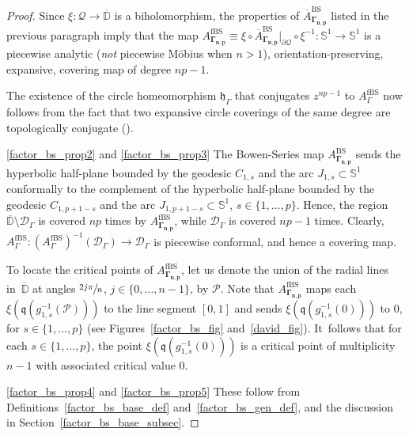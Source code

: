 \documentclass[JEP,XML,SOM,Unicode,NoFloatCountersInSection,published]{cedram}
\theoremstyle{definition}
\theoremstyle{remark}
\newcommand{\D}{\mathbb{D}}
\begin{document}
\begin{proof}
Since $\xi:\mathcal{Q}\to\overline{\D}$ is a biholomorphism, the properties of $\overline{A}_{\pmb{\Gamma_{n,p}}}^{\mathrm{BS}}$ listed in the previous paragraph imply that the map $A_{\pmb{\Gamma_{n,p}}}^{\mathrm{fBS}}\equiv \xi\circ \overline{A}_{\pmb{\Gamma_{n,p}}}^{\mathrm{BS}}\vert_{\partial\mathcal{Q}}\circ\xi^{-1}:\mathbb{S}^1\to\mathbb{S}^1$ is a piecewise analytic (\emph{not} piecewise Möbius when $n>1$), orientation-preserving, expansive, covering map of degree $np-1$.

The existence of the circle homeomorphism $\mathfrak{h}_\Gamma$ that conjugates $z^{np-1}$ to $A_\Gamma^{\mathrm{fBS}}$ now follows from the fact that two expansive circle coverings of the same degree are topologically conjugate (\cf \cite[Property~(2'), p.\,99]{CR80}).

\eqref{factor_bs_prop2} and \eqref{factor_bs_prop3} The Bowen-Series map $A_{\pmb{\Gamma_{n,p}}}^{\mathrm{BS}}$ sends the hyperbolic half-plane bounded by the geodesic $C_{1,s}$ and the arc $J_{1,s}\subset\mathbb{S}^1$ conformally to the complement of the hyperbolic half-plane bounded by the geodesic $C_{1,p+1-s}$ and the arc $J_{1,p+1-s}\subset\mathbb{S}^1$, $s\in\{1,\dots,p\}$. Hence, the region $\overline{\D}\setminus\mathcal{D}_{\Gamma}$ is covered $np$ times by $A_{\pmb{\Gamma_{n,p}}}^{\mathrm{fBS}}$, while $\mathcal{D}_{\Gamma}$ is covered $np-1$ times. Clearly, $A_{\Gamma}^{\mathrm{fBS}}: \left(A_{\Gamma}^{\mathrm{fBS}}\right)^{-1}(\mathcal{D}_{\Gamma})\to \mathcal{D}_{\Gamma}$ is piecewise conformal, and hence a covering map.

To locate the critical points of $A_{\pmb{\Gamma_{n,p}}}^{\mathrm{fBS}}$, let us denote the union of the radial lines in~$\overline{\D}$ at angles $\sfrac{2j\pi}{n}$, $j\in\{0,\dots,n-1\}$, by $\mathcal{P}$. Note that $A_{\pmb{\Gamma_{n,p}}}^{\mathrm{fBS}}$ maps each $\xi(\mathfrak{q}(g_{1,s}^{-1}(\mathcal{P})))$ to the line segment $[0,1]$ and sends $\xi(\mathfrak{q}(g_{1,s}^{-1}(0)))$ to $0$, for $s\in\{1,\dots,p\}$ (see Figures~\ref{factor_bs_fig} and~\ref{david_fig}). It~follows that for each $s\in\{1,\dots,p\}$, the point $\xi(\mathfrak{q}(g_{1,s}^{-1}(0)))$ is a critical point of multiplicity $n-1$ with associated critical value $0$.

\eqref{factor_bs_prop4} and \eqref{factor_bs_prop5} These follow from Definitions~\ref{factor_bs_base_def} and~\ref{factor_bs_gen_def}, and the discussion in Section~\ref{factor_bs_base_subsec}.
\end{proof}
\end{document}
